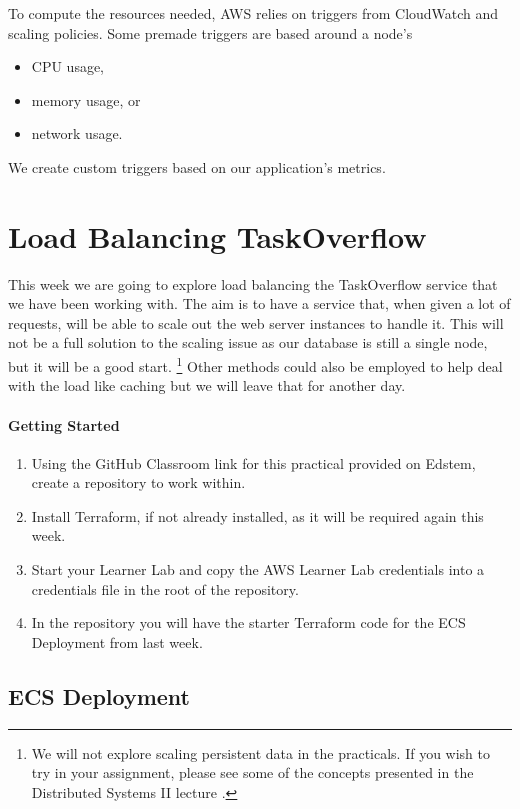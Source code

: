 \documentclass{csse4400}
\begin{document}
To compute the resources needed, AWS relies on triggers from CloudWatch and scaling policies.
Some premade triggers are based around a node's

\begin{itemize}
    \item CPU usage,
    \item memory usage, or 
    \item network usage.
\end{itemize}

We create custom triggers based on our application's metrics.


\section{Load Balancing TaskOverflow}

This week we are going to explore load balancing the TaskOverflow service that we have been working with.
The aim is to have a service that, when given a lot of requests,
will be able to scale out the web server instances to handle it.
This will not be a full solution to the scaling issue as our database is still a single node,
but it will be a good start.%
\footnote{We will not explore scaling persistent data in the practicals.
If you wish to try in your assignment,
please see some of the concepts presented in the Distributed Systems II lecture \cite{distributed2-slides}.}
Other methods could also be employed to help deal with the load like caching but we will leave that for another day.

\paragraph{Getting Started}
\begin{enumerate}
    \item Using the GitHub Classroom link for this practical provided on Edstem, create a repository to work within.
    \item Install Terraform, if not already installed, as it will be required again this week.
    \item Start your Learner Lab and copy the AWS Learner Lab credentials into a credentials file in the root of the repository.
    \item In the repository you will have the starter Terraform code for the ECS Deployment from last week.
\end{enumerate}

\subsection{ECS Deployment}
\label{pathb}
\end{document}
